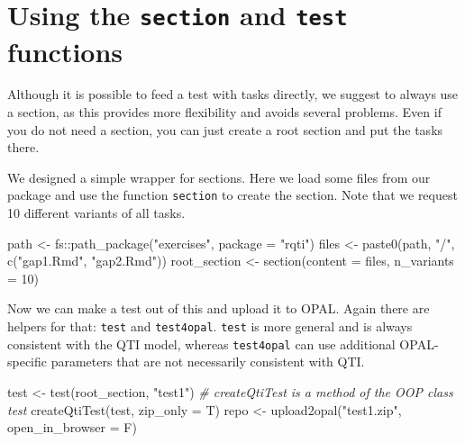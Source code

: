 \documentclass[twoside]{tufte-book}
\newenvironment{Shaded}{}{}
\newcommand{\AttributeTok}[1]{\textcolor[rgb]{0.49,0.56,0.16}{#1}}
\newcommand{\CommentTok}[1]{\textcolor[rgb]{0.38,0.63,0.69}{\textit{#1}}}
\newcommand{\DecValTok}[1]{\textcolor[rgb]{0.25,0.63,0.44}{#1}}
\newcommand{\FunctionTok}[1]{\textcolor[rgb]{0.02,0.16,0.49}{#1}}
\newcommand{\NormalTok}[1]{#1}
\newcommand{\OtherTok}[1]{\textcolor[rgb]{0.00,0.44,0.13}{#1}}
\newcommand{\SpecialCharTok}[1]{\textcolor[rgb]{0.25,0.44,0.63}{#1}}
\newcommand{\StringTok}[1]{\textcolor[rgb]{0.25,0.44,0.63}{#1}}
\begin{document}
\section{\texorpdfstring{Using the \texttt{section} and \texttt{test} functions}{Using the section and test functions}}\label{using-the-section-and-test-functions}

Although it is possible to feed a test with tasks directly, we suggest to always use a section, as this provides more flexibility and avoids several problems. Even if you do not need a section, you can just create a root section and put the tasks there.

We designed a simple wrapper for sections. Here we load some files from our package and use the function \texttt{section} to create the section. Note that we request 10 different variants of all tasks.

\begin{Shaded}
\begin{Highlighting}[]
\NormalTok{path }\OtherTok{\textless{}{-}}\NormalTok{ fs}\SpecialCharTok{::}\FunctionTok{path\_package}\NormalTok{(}\StringTok{"exercises"}\NormalTok{, }\AttributeTok{package =} \StringTok{"rqti"}\NormalTok{)}
\NormalTok{files }\OtherTok{\textless{}{-}} \FunctionTok{paste0}\NormalTok{(path, }\StringTok{"/"}\NormalTok{, }\FunctionTok{c}\NormalTok{(}\StringTok{"gap1.Rmd"}\NormalTok{, }\StringTok{"gap2.Rmd"}\NormalTok{))}
\NormalTok{root\_section }\OtherTok{\textless{}{-}} \FunctionTok{section}\NormalTok{(}\AttributeTok{content =}\NormalTok{ files, }\AttributeTok{n\_variants =} \DecValTok{10}\NormalTok{)}
\end{Highlighting}
\end{Shaded}

Now we can make a test out of this and upload it to OPAL. Again there are helpers for that: \texttt{test} and \texttt{test4opal}. \texttt{test} is more general and is always consistent with the QTI model, whereas \texttt{test4opal} can use additional OPAL-specific parameters that are not necessarily consistent with QTI.

\begin{Shaded}
\begin{Highlighting}[]
\NormalTok{test }\OtherTok{\textless{}{-}} \FunctionTok{test}\NormalTok{(root\_section, }\StringTok{"test1"}\NormalTok{)}
\CommentTok{\# createQtiTest is a method of the OOP class \textasciigrave{}test\textasciigrave{}}
\FunctionTok{createQtiTest}\NormalTok{(test, }\AttributeTok{zip\_only =}\NormalTok{ T)}
\NormalTok{repo }\OtherTok{\textless{}{-}} \FunctionTok{upload2opal}\NormalTok{(}\StringTok{"test1.zip"}\NormalTok{, }\AttributeTok{open\_in\_browser =}\NormalTok{ F)}
\end{Highlighting}
\end{Shaded}
\end{document}
